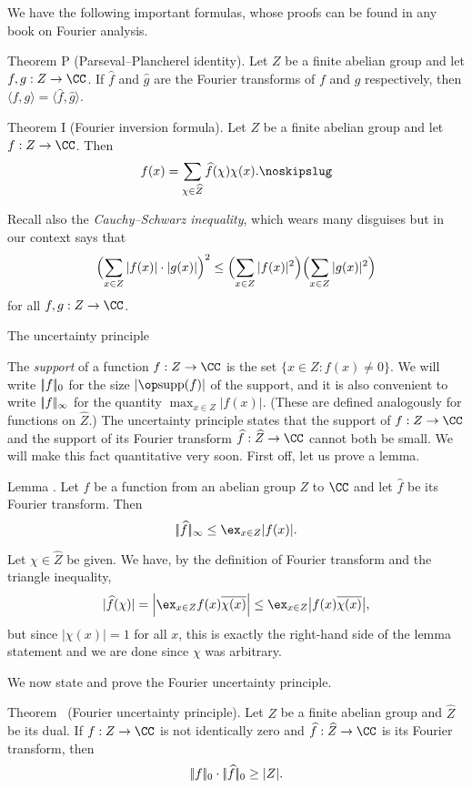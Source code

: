We have the following important formulas, whose proofs
can be found in any book on Fourier analysis.

\parenproclaim Theorem P (Parseval--Plancherel identity). Let $Z$ be a finite abelian group and
let $f,g : Z\to \CC$. If $\hat f$ and $\hat g$ are the Fourier transforms of $f$ and $g$ respectively,
then $\langle f,g \rangle = \langle \hat f, \hat g\rangle$.\slug

\parenproclaim Theorem I (Fourier inversion formula). Let $Z$ be a finite abelian group and let $f:Z\to \CC$.
Then
$$f(x) = \sum_{\chi\in \hat Z} \hat f(\chi) \chi(x).\noskipslug$$

Recall also the {\it Cauchy--Schwarz inequality}, which wears many disguises but in our context says that
$$ \Bigl( \sum_{x\in Z} |f(x)|\cdot |g(x)| \Bigr)^2
\le \Bigl(\sum_{x\in Z} |f(x)|^2\Bigr)\Bigl( \sum_{x\in Z} |g(x)|^2\Bigr)$$
for all $f,g : Z\to \CC$.

\advsect The uncertainty principle

The {\it support} of a function $f:Z\to \CC$ is the set $\{x\in Z : f(x)\ne 0\}$. We will write
$|\!|f|\!|_0$ for the size $|\supp(f)|$ of the support, and it is also convenient to write
$|\!|f|\!|_\infty$ for the quantity $\max_{x\in Z} |f(x)|$. (These are defined analogously for
functions on $\hat Z$.) The uncertainty principle states that
the support of $f:Z\to \CC$ and the support of its Fourier transform $\hat f:\hat Z\to \CC$ cannot both
be small. We will make this fact quantitative very soon. First off, let us prove a lemma.

\proclaim Lemma \advthm. Let $f$ be a function from an abelian group $Z$ to $\CC$ and let $\hat f$
be its Fourier transform. Then
$$\norm{\hat f}_\infty \le \ex_{x\in Z} |f(x)|.$$

\proof Let $\chi\in \hat Z$ be given. We have, by the definition of Fourier transform
and the triangle inequality,
$$|\hat f(\chi)| = \Bigl| \ex_{x\in Z} f(x) \bar{\chi(x)} \Bigr|
\le \ex_{x\in Z} \bigl| f(x) \bar{\chi(x)} \bigr|,$$
but since $|\chi(x)| = 1$ for all $x$, this is exactly the right-hand side of the lemma statement
and we are done since $\chi$ was arbitrary.\slug

We now state and prove the Fourier uncertainty principle.

\parenproclaim Theorem~{\advthm} (Fourier uncertainty principle).
Let $Z$ be a finite abelian group and $\hat Z$ be its dual. If $f : Z\to \CC$ is not identically zero
and $\hat f: \hat Z\to \CC$ is its Fourier transform, then
$$|\!|f|\!|_0 \cdot |\!|\widehat f|\!|_0 \ge |Z|.$$

